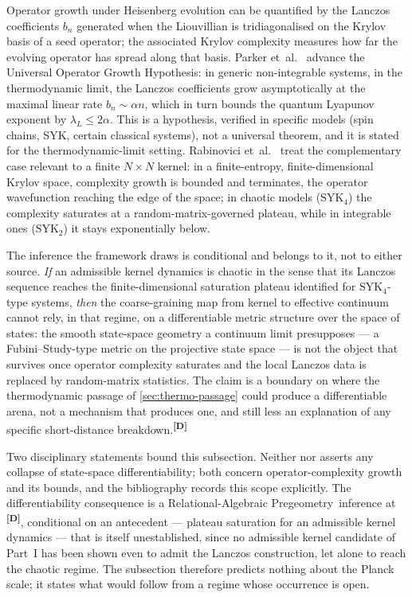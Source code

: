 \documentclass[12pt,a4paper,twoside]{article}
\theoremstyle{plain}
\theoremstyle{definition}
\theoremstyle{remark}
\newcommand{\ProjectShort}{Relational-Algebraic Pregeometry}
\newcommand{\RAP}{\ProjectShort}
\newcommand{\catmark}[1]{\textsuperscript{\textsf{\textbf{[#1]}}}}
\begin{document}
Operator growth under Heisenberg evolution can be quantified by the Lanczos
coefficients $b_n$ generated when the Liouvillian is tridiagonalised on the
Krylov basis of a seed operator; the associated Krylov complexity measures
how far the evolving operator has spread along that basis. Parker
et~al.~\cite{parker2019} advance the Universal Operator Growth Hypothesis:
in generic non-integrable systems, in the thermodynamic limit, the Lanczos
coefficients grow asymptotically at the maximal linear rate
$b_n \sim \alpha n$, which in turn bounds the quantum Lyapunov exponent by
$\lambda_L \le 2\alpha$. This is a hypothesis, verified in specific models
(spin chains, SYK, certain classical systems), not a universal theorem, and
it is stated for the thermodynamic-limit setting. Rabinovici
et~al.~\cite{rabinovici2021} treat the complementary case relevant to a
finite $N\times N$ kernel: in a finite-entropy, finite-dimensional Krylov
space, complexity growth is bounded and terminates, the operator
wavefunction reaching the edge of the space; in chaotic models
($\mathrm{SYK}_4$) the complexity saturates at a random-matrix-governed
plateau, while in integrable ones ($\mathrm{SYK}_2$) it stays exponentially
below.

The inference the framework draws is conditional and belongs to it, not to
either source. \emph{If} an admissible kernel dynamics is chaotic in the
sense that its Lanczos sequence reaches the finite-dimensional saturation
plateau identified for $\mathrm{SYK}_4$-type systems, \emph{then} the
coarse-graining map from kernel to effective continuum cannot rely, in that
regime, on a differentiable metric structure over the space of states: the
smooth state-space geometry a continuum limit presupposes --- a
Fubini--Study-type metric on the projective state space --- is not the
object that survives once operator complexity saturates and the local
Lanczos data is replaced by random-matrix statistics. The claim is a
boundary on where the thermodynamic passage of \cref{sec:thermo-passage}
could produce a differentiable arena, not a mechanism that produces one,
and still less an explanation of any specific short-distance
breakdown.\catmark{D}

Two disciplinary statements bound this subsection. Neither
\cite{parker2019} nor \cite{rabinovici2021} asserts any collapse of
state-space differentiability; both concern operator-complexity growth and
its bounds, and the bibliography records this scope explicitly. The
differentiability consequence is a \RAP\ inference at \catmark{D},
conditional on an antecedent --- plateau saturation for an admissible
kernel dynamics --- that is itself unestablished, since no admissible
kernel candidate of Part~I has been shown even to admit the Lanczos
construction, let alone to reach the chaotic regime. The subsection
therefore predicts nothing about the Planck scale; it states what would
follow from a regime whose occurrence is open.
\end{document}
